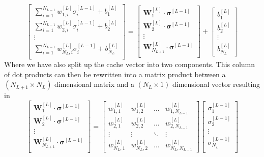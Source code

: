 \documentclass[12pt]{article}
\begin{document}
\begin{equation}
\begin{bmatrix}
\sum_{i=1}^{N_{L-1}}w_{1,i}^{[L]}\sigma_{i}^{[L-1]} + b^{[L]}_1 \\
\sum_{i=1}^{N_{L-1}}w_{2,i}^{[L]}\sigma_{i}^{[L-1]} + b^{[L]}_2 \\
\vdots \\
\sum_{i=1}^{N_{L-1}}w_{N_{L},i}^{[L]}\sigma_{i}^{[L-1]} + b^{[L]}_{N_{L}} \\
\end{bmatrix}
=
\begin{bmatrix}
\textbf{W}^{[L]}_1 \cdot \bm{\sigma}^{[L-1]}\\
\textbf{W}^{[L]}_2 \cdot \bm{\sigma}^{[L-1]}\\
\vdots \\
\textbf{W}^{[L]}_{N_{L+1}} \cdot \bm{\sigma}^{[L-1]}\\
\end{bmatrix}
+
\begin{bmatrix}
b^{[L]}_1 \\
b^{[L]}_2 \\
\vdots \\
b^{[L]}_{N_{L}}
\end{bmatrix}
\end{equation}
Where we have also split up the cache vector into two components. This column of dot products can then be rewritten into a matrix product between a $(N_{L+1} \times N_L)$ dimensional matrix and a $(N_L \times 1)$ dimensional vector resulting in 
\begin{equation}
\begin{bmatrix}
\textbf{W}^{[L]}_1 \cdot \bm{\sigma}^{[L-1]}\\
\textbf{W}^{[L]}_2 \cdot \bm{\sigma}^{[L-1]}\\
\vdots \\
\textbf{W}^{[L]}_{N_{L+1}} \cdot \bm{\sigma}^{[L-1]}\\
\end{bmatrix}
=
\begin{bmatrix}
w^{[L]}_{1,1} & w^{[L]}_{1,2} & \dots & w^{[L]}_{1,N_{L-1}} \\
w^{[L]}_{2,1} & w^{[L]}_{2,2} & \dots & w^{[L]}_{2,N_{L-1}} \\
\vdots & \vdots & \ddots & \vdots \\
w^{[L]}_{N_{L},1} & w^{[L]}_{N_{L},2} & \dots & w^{[L]}_{N_{L},N_{L-1}}
\end{bmatrix}
\begin{bmatrix}
\sigma^{[L-1]}_1 \\
\sigma^{[L-1]}_2 \\
\vdots \\
\sigma^{[L-1]}_{N_L} \\
\end{bmatrix} 
\end{equation}
\end{document}
